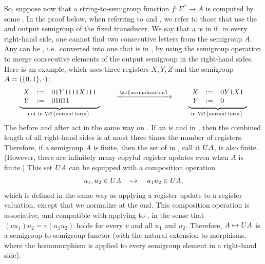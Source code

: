 \AP So, suppose now that a string-to-semigroup function $f\colon \Sigma^* \to A$ is computed by some  \sst. In the proof below, when referring to  and , we refer to those that use the  and output semigroup of the fixed transducer. We say that a  is in  if, in every right-hand side, one cannot find two consecutive letters from the semigroup $A$.
Any  can be , i.e.~converted into one that is in , by using the semigroup operation to merge consecutive elements of the output semigroup in the right-hand sides.
Here is an example, which uses three registers $X,Y,Z$ and the semigroup $A = (\{0,1\}, \cdot)$:
\begin{align*}
  \myunderbrace{
  \begin{array}{rcl}
    X &:=& 01Y1111X111\\
    Y &:=& 01011
  \end{array}
  }{not in \kl{normal form}}
  \qquad \xrightarrow{\;\text{\kl{normalization}}\;} \qquad
  \myunderbrace{
  \begin{array}{rcl}
    X &:=& 0Y1X1\\
    Y &:=& 0
  \end{array}
  }{in \kl{normal form}}
\end{align*}
The  before and after  act in the same way on
. If an  is  and in , then the
combined length of all right-hand sides is at most three times the number of
registers. Therefore, if a semigroup $A$ is finite, then the set of 
 in , call it $\functoru A$, is also finite.
(However, there are infinitely many copyful register updates even when $A$ is
finite.) This set $\functoru A$ can be equipped with a composition operation
\begin{align*}
    u_1,u_2 \in \functoru A  \quad \mapsto \quad u_1u_2 \in \functoru A,
\end{align*}
which is defined in the same way as applying a register update to a register
valuation, except that we normalize at the end. This composition operation is
associative, and  compatible with applying  to , in the sense that $(vu_1)u_2 = v(u_1u_2)$ holds for every  $v$ and all  $u_1$ and $u_2$. Therefore, $A \mapsto \functoru A$ is a  semigroup-to-semigroup functor (with the natural extension to morphisms, where the homomorphism is applied to every semigroup element in a right-hand side). 

